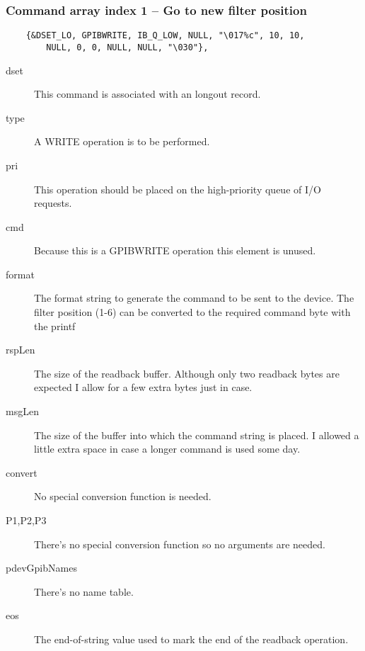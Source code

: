 \documentclass[twoside]{article}
\begin{document}
\subsubsection{Command array index 1 -- Go to new filter position}
\begin{verbatim}
    {&DSET_LO, GPIBWRITE, IB_Q_LOW, NULL, "\017%c", 10, 10,
        NULL, 0, 0, NULL, NULL, "\030"},
\end{verbatim}
\begin{description}
\item[dset] This command is associated with an longout record.
\item[type] A WRITE operation is to be performed.
\item[pri] This operation should be placed on the high-priority queue
of I/O requests.
\item[cmd] Because this is a GPIBWRITE operation this element is unused.
\item[format] The format string to generate the command to be sent to the device.
The filter
position (1-6) can be converted to the
required command byte with the printf \verb@%c@ format.
\item[rspLen] The size of the readback buffer.  Although only two readback bytes are
expected I allow for a few extra bytes just in case.
\item[msgLen] The size of the buffer into which the command string is placed.  I allowed
a little extra space in case a longer command is used some day.
\item[convert] No special conversion function is needed.
\item[P1,P2,P3] There's no special conversion function so no arguments are needed.
\item[pdevGpibNames] There's no name table.
\item[eos] The end-of-string value used to mark the end of the readback operation.
\end{description}
\end{document}
